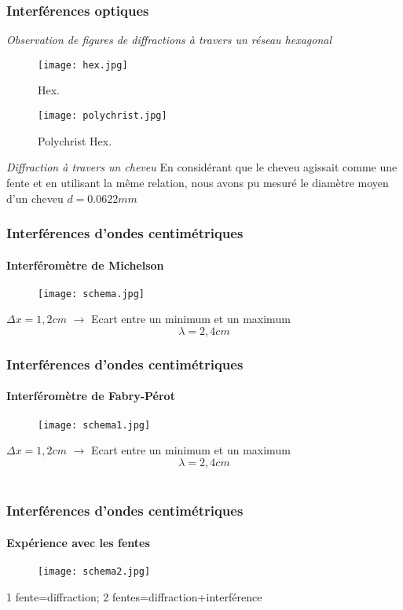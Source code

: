 \documentclass{beamer}
\begin{document}
\begin{frame}
\frametitle{Interférences optiques}

\emph{Observation de figures de diffractions à travers un réseau hexagonal}
\begin{minipage}[t]{0.46\textwidth}
	\begin{figure}
		\centering
		\texttt{[image: hex.jpg]}
		\caption{Hex.}
	\end{figure}
\end{minipage}
\begin{minipage}[t]{0.46\textwidth}
	\begin{figure}
		\centering
		\texttt{[image: polychrist.jpg]}
		\caption{Polychrist Hex.}
	\end{figure}
\end{minipage}

\emph{Diffraction à travers un cheveu}
\newline
En considérant que le cheveu agissait comme une fente et en utilisant la même relation, nous avons pu mesuré le diamètre moyen d'un cheveu $d=0.0622mm$


\end{frame}


\begin{frame}
\frametitle{Interférences d'ondes centimétriques}
\framesubtitle{Interféromètre de Michelson}
\begin{figure}\centering
\texttt{[image: schema.jpg]}
\end{figure}

$\Delta x = 1,2 cm$ $\rightarrow$  Ecart entre un minimum et un maximum 
$$\lambda = 2,4 cm$$

\end{frame} 

\begin{frame}
\frametitle{Interférences d'ondes centimétriques}
\framesubtitle{Interféromètre de Fabry-Pérot}
\begin{figure}\centering
\texttt{[image: schema1.jpg]}
\end{figure}

$\Delta x = 1,2 cm$ $\rightarrow$  Ecart entre un minimum et un maximum 
$$\lambda = 2,4 cm$$\\

\end{frame} 

\begin{frame}
\frametitle{Interférences d'ondes centimétriques}
\framesubtitle{Expérience avec les fentes}
\begin{figure}\centering
\texttt{[image: schema2.jpg]}
\end{figure}

1 fente=diffraction;
2 fentes=diffraction+interférence


\end{frame} 
\end{document}
